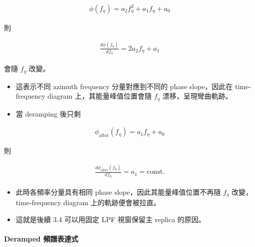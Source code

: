 \documentclass[10pt]{article}
\begin{document}
\begin{equation}
\begin{aligned}
\phi(f_\eta)=a_2 f_\eta^2+a_1 f_\eta+a_0
\end{aligned}
\end{equation}

則

\begin{equation}
\begin{aligned}
\frac{d\phi(f_\eta)}{df_\eta}=2a_2 f_\eta+a_1
\end{aligned}
\end{equation}

會隨 \(f_\eta\) 改變。

\begin{itemize}
\item
  這表示不同 azimuth frequency 分量對應到不同的 phase slope，因此在
  time-frequency diagram 上，其能量峰值位置會隨 \(f_\eta\)
  漂移，呈現彎曲軌跡。
\item
  當 deramping 後只剩
\end{itemize}

\begin{equation}
\begin{aligned}
\phi_{\mathrm{after}}(f_\eta)=a_1 f_\eta+a_0
\end{aligned}
\end{equation}

則

\begin{equation}
\begin{aligned}
\frac{d\phi_{\mathrm{after}}(f_\eta)}{df_\eta}=a_1=\mathrm{const.}
\end{aligned}
\end{equation}

\begin{itemize}
\item
  此時各頻率分量具有相同 phase slope，因此其能量峰值位置不再隨
  \(f_\eta\) 改變，time-frequency diagram 上的軌跡便會被拉直。
\item
  這就是後續 3.4 可以用固定 LPF 視窗保留主 replica 的原因。
\end{itemize}

\hypertarget{deramped-ux983bux8b5cux8868ux9054ux5f0f}{%
\paragraph{Deramped
頻譜表達式}\label{deramped-ux983bux8b5cux8868ux9054ux5f0f}}
\end{document}
